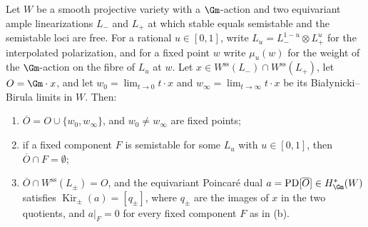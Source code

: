\begin{lemma}
\label{lem:orbit-cylinder-disjoint}
Let \(W\) be a smooth projective variety with a \(\Gm\)-action and two
equivariant ample linearizations \(L_-\) and \(L_+\) at which stable equals
semistable and the semistable loci are free.  For a rational
\(u\in[0,1]\), write \(L_u=L_-^{1-u}\otimes L_+^{u}\) for the interpolated
polarization, and for a fixed point \(w\) write \(\mu_u(w)\) for the weight
of the \(\Gm\)-action on the fibre of \(L_u\) at \(w\).  Let \(x\in
W^{\mathrm{ss}}(L_-)\cap W^{\mathrm{ss}}(L_+)\), let
\(O=\Gm\cdot x\), and let
\(w_0=\lim_{t\to0}t\cdot x\) and \(w_\infty=\lim_{t\to\infty}t\cdot x\) be
its Bia{\l}ynicki--Birula limits in \(W\).  Then:
\begin{enumerate}[label=\textup{(\alph*)}]
\item \(\overline O=O\cup\{w_0,w_\infty\}\), and \(w_0\ne w_\infty\) are
  fixed points;
\item if a fixed component \(F\) is semistable for some \(L_u\) with
  \(u\in[0,1]\), then \(\overline O\cap F=\emptyset\);
\item \(\overline O\cap W^{\mathrm{ss}}(L_\pm)=O\), and the equivariant
  Poincar\'e dual \(a=\mathrm{PD}[\overline O]\in H^*_{\Gm}(W)\) satisfies
  \(\operatorname{Kir}_\pm(a)=[q_\pm]\), where \(q_\pm\) are the images of
  \(x\) in the two quotients, and \(a|_F=0\) for every fixed component
  \(F\) as in \textup{(b)}.
\end{enumerate}
\end{lemma}

